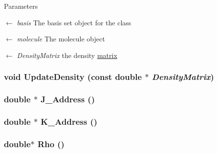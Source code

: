 \begin{DoxyParams}{Parameters}
\item[\mbox{$\leftarrow$} {\em basis}]The basis set object for the class \item[\mbox{$\leftarrow$} {\em molecule}]The molecule object \item[\mbox{$\leftarrow$} {\em DensityMatrix}]the density \hyperlink{classJKBuilder_1_1matrix}{matrix} \end{DoxyParams}
\hypertarget{classJKBuilder_1_1JK_ac0b62715458b98f8426017fdd8864670}{
\subsubsection[{UpdateDensity}]{\setlength{\rightskip}{0pt plus 5cm}void UpdateDensity (const double $\ast$ {\em DensityMatrix})}}
\label{classJKBuilder_1_1JK_ac0b62715458b98f8426017fdd8864670}
\hypertarget{classJKBuilder_1_1JK_ada0787d51feb1496d4aa3a786f870f88}{
\subsubsection[{J\_\-Address}]{\setlength{\rightskip}{0pt plus 5cm}double $\ast$ J\_\-Address ()}}
\label{classJKBuilder_1_1JK_ada0787d51feb1496d4aa3a786f870f88}
\hypertarget{classJKBuilder_1_1JK_a198d3c4da107eb0d9cfafa795f8d635b}{
\subsubsection[{K\_\-Address}]{\setlength{\rightskip}{0pt plus 5cm}double $\ast$ K\_\-Address ()}}
\label{classJKBuilder_1_1JK_a198d3c4da107eb0d9cfafa795f8d635b}
\hypertarget{classJKBuilder_1_1JK_a5104eb472d984f59df6ca3b91c625209}{
\subsubsection[{Rho}]{\setlength{\rightskip}{0pt plus 5cm}double$\ast$ Rho ()}}
\label{classJKBuilder_1_1JK_a5104eb472d984f59df6ca3b91c625209}


